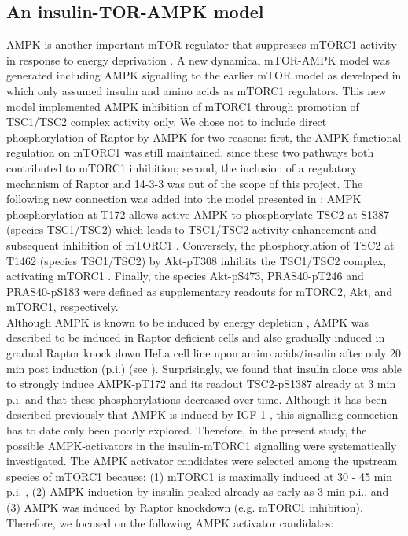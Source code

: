 \subsection{An insulin-TOR-AMPK model}
\label{paper2-subsec:An insulin-TOR-AMPK model}
AMPK is another important mTOR regulator that suppresses mTORC1 activity in response to energy deprivation \citep{Mihaylova2011}. A new dynamical mTOR-AMPK model was generated including AMPK signalling to the earlier mTOR model as developed in \citep{DallePezze2012a} which only assumed insulin and amino acids as mTORC1 regulators. This new model implemented AMPK inhibition of mTORC1 through promotion of TSC1/TSC2 complex activity only. We chose not to include direct phosphorylation of Raptor by AMPK for two reasons: first, the AMPK functional regulation on mTORC1 was still maintained, since these two pathways both contributed to mTORC1 inhibition; second, the inclusion of a regulatory mechanism of Raptor and 14-3-3 was out of the scope of this project. The following new connection was added into the model presented in \citep{DallePezze2012a}: AMPK phosphorylation at T172 allows active AMPK to phosphorylate TSC2 at S1387 (species TSC1/TSC2) which leads to TSC1/TSC2 activity enhancement and subsequent inhibition of mTORC1 \citep{Inoki2003, Inoki2005, Mihaylova2011}. Conversely, the phosphorylation of TSC2 at T1462 (species TSC1/TSC2) by Akt-pT308 inhibits the TSC1/TSC2 complex, activating mTORC1 \citep{Inoki2002}. Finally, the species Akt-pS473, PRAS40-pT246 and PRAS40-pS183 were defined as supplementary readouts for mTORC2, Akt, and mTORC1, respectively. \\
Although AMPK is known to be induced by energy depletion \citep{Mihaylova2011}, AMPK was described to be induced in Raptor deficient cells \citep{Polak2008, Aguilar2007} and also gradually induced in gradual Raptor knock down HeLa cell line upon amino acids/insulin after only 20 min post induction (p.i.) (see \citep[Fig. 1A]{Sonntag2012}). Surprisingly, we found that insulin alone was able to strongly induce AMPK-pT172 and its readout TSC2-pS1387 already at 3 min p.i. and that these phosphorylations decreased over time. Although it has been described previously that AMPK is induced by IGF-1 \citep{Suzuki2004}, this signalling connection has to date only been poorly explored. Therefore, in the present study, the possible AMPK-activators in the insulin-mTORC1 signalling were systematically investigated. 
The AMPK activator candidates were selected among the upstream species of mTORC1 because: (1) mTORC1 is maximally induced at 30 - 45 min p.i. \citep{DallePezze2012a}, (2) AMPK induction by insulin peaked already as early as 3 min p.i., and (3) AMPK was induced by Raptor knockdown (e.g. mTORC1 inhibition). Therefore, we focused on the following AMPK activator candidates:
